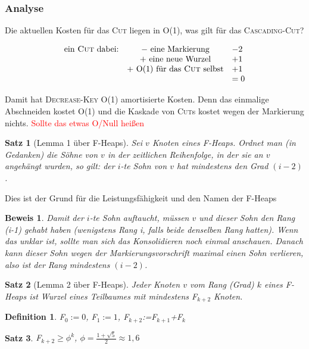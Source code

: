 \documentclass[ngerman,draft,parskip=half*,twoside]{scrreprt}
\theoremstyle{break}
\newtheorem{beweis}{Beweis}
\newtheorem{definition}{Definition}
\newtheorem{satz}{Satz}
\begin{document}
\subsubsection{Analyse}
Die aktuellen Kosten für das \textsc{Cut} liegen in O(1), was gilt für das \textsc{Cascading-Cut}?

\[
\begin{array}{ccl}
\mbox{ein \textsc{Cut} dabei:} & - \mbox{ eine Markierung} & -2\\
 &  + \mbox{ eine neue Wurzel} & +1\\
 &  + \mbox{ O(1) für das \textsc{Cut} selbst} & +1\\
 &  & =0
\end{array}\]

Damit hat \textsc{Decrease-Key} O(1) amortisierte Kosten. Denn das einmalige Abschneiden kostet O(1) und die Kaskade von
\textsc{Cut}s kostet wegen der Markierung nichts. \textcolor{red}{Sollte das etwas O/Null heißen}

\begin{satz}[Lemma 1 über F-Heaps]
Sei $v$ Knoten eines F-Heaps. Ordnet man (in Gedanken) die Söhne von $v$ in der zeitlichen Reihenfolge, in der sie an
$v$ angehängt wurden, so gilt: der $i$-te Sohn von $v$ hat mindestens den Grad $(i-2)$. 
\end{satz}
Dies ist der Grund für die Leistungsfähigkeit und den Namen der F-Heaps

\begin{beweis}
Damit der $i$-te Sohn auftaucht, müssen $v$ und dieser Sohn den Rang (i-1) gehabt haben (wenigstens Rang i, falls beide
denselben Rang hatten). Wenn das unklar ist, sollte man sich das Konsolidieren noch einmal anschauen. Danach kann dieser
Sohn wegen der Markierungsvorschrift maximal einen Sohn verlieren, also ist der Rang mindestens $(i-2)$. 
\end{beweis}

\begin{satz}[Lemma 2 über F-Heaps]
Jeder Knoten $v$ vom Rang (Grad) $k$ eines F-Heaps ist Wurzel eines Teilbaumes mit mindestens F$_{k+2}$ Knoten.
\end{satz}

\begin{definition}
F$_0:=0$, F$_1:=1$, F$_{k+2}$:=F$_{k+1}$+F$_{k}$
\end{definition}

\begin{satz}
F$_{k+2} \geq {\phi}^k$, $\phi=\frac{1+\sqrt{5}}{2}\approx 1,6$ 
\end{satz}
\end{document}
